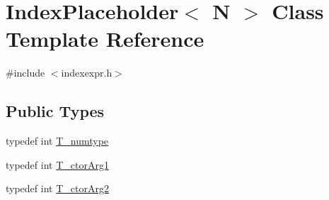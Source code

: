 \hypertarget{classIndexPlaceholder}{}\section{Index\+Placeholder$<$ N $>$ Class Template Reference}
\label{classIndexPlaceholder}


{\ttfamily \#include $<$indexexpr.\+h$>$}

\subsection*{Public Types}
\begin{DoxyCompactItemize}
\item 
typedef int \hyperlink{classIndexPlaceholder_ad03df79ee5a3bed19e6a8de0dd67cc16}{T\+\_\+numtype}
\item 
typedef int \hyperlink{classIndexPlaceholder_a6ea3b540cd6570da5b5cd10bb258e8cc}{T\+\_\+ctor\+Arg1}
\item 
typedef int \hyperlink{classIndexPlaceholder_a3142b177266f6c86d2d229ba69cac2d0}{T\+\_\+ctor\+Arg2}
\end{DoxyCompactItemize}
